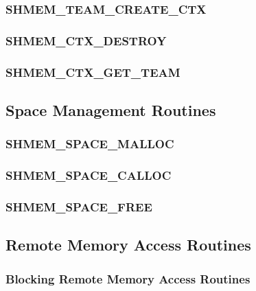 \documentclass[10pt,oneside]{book}
\begin{document}
\subsubsection{\textbf{SHMEM\_TEAM\_CREATE\_CTX}}
\label{subsec:shmem_team_create_ctx}


\subsubsection{\textbf{SHMEM\_CTX\_DESTROY}}
\label{subsec:shmem_ctx_destroy}


\subsubsection{\textbf{SHMEM\_CTX\_GET\_TEAM}}
\label{subsec:shmem_ctx_get_team}





\subsection{Space Management Routines}\label{subsec:space}


\subsubsection{\textbf{SHMEM\_SPACE\_MALLOC}}\label{subsec:shmem_space_malloc}


\subsubsection{\textbf{SHMEM\_SPACE\_CALLOC}}\label{subsec:shmem_space_calloc}


\subsubsection{\textbf{SHMEM\_SPACE\_FREE}}\label{subsec:shmem_space_free}





\subsection{Remote Memory Access Routines}\label{sec:rma}


\subsubsection{Blocking Remote Memory Access Routines}\label{subsec:rma}
\label{subsec:shmem_put}

\end{document}
